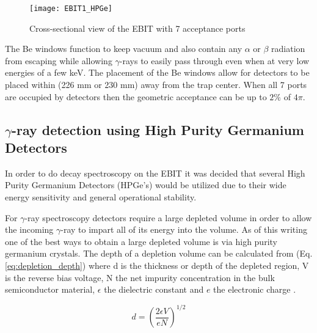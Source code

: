 \documentclass[jon_ringuette_thesis_proposal.tex]{subfiles}
\begin{document}
    \begin{figure}[H]
        \begin{center}
            \texttt{[image: EBIT1\_HPGe]}
        \end{center}
        \caption{\small Cross-sectional view of the EBIT with 7 acceptance ports \cite{TITAN2015}}
        \label{fig:ebit_geometric_acceptance}
    \end{figure}

    The Be windows function to keep vacuum and also contain any $\alpha$ or $\beta$ radiation from escaping while allowing $\gamma$-rays to easily pass through even when at very low energies of a few keV.
    The placement of the Be windows allow for detectors to be placed within (226 mm or 230 mm) away from the trap center.
    When all 7 ports are occupied by detectors then the geometric acceptance can be up to $2\%$ of $4\pi$.


    \subsection{$\gamma$-ray detection using High Purity Germanium Detectors}
    In order to do decay spectroscopy on the EBIT it was decided that several High Purity Germanium Detectors (HPGe's) would be utilized due to their wide energy sensitivity and general operational stability.

    For $\gamma$-ray spectroscopy detectors require a large depleted volume in order to allow the incoming $\gamma$-ray to impart all of its energy into the volume.
    As of this writing one of the best ways to obtain a large depleted volume is via high purity germanium crystals.
    The depth of a depletion volume can be calculated from (Eq. \ref{eq:depletion_depth}) where d is the thickness or depth of the depleted region, V is the reverse bias voltage, N the net impurity concentration in the bulk semiconductor material, $\epsilon$ the dielectric constant and $e$ the electronic charge \cite{KNOLL}.

    \begin{equation}
        d = \left( \frac{2 \epsilon V}{e N} \right)^{1/2}
        \label{eq:depletion_depth}
    \end{equation}
\end{document}
